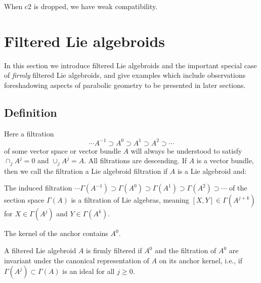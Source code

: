 \documentclass[leqno,12pt]{amsart} %
\newcommand\refreshpage{\newpage}
\newcommand\refreshpage{}
\begin{document}
When c2 is dropped, we have {\df weak compatibility}.

\refreshpage
\section{Filtered Lie algebroids}\label{introduction}
In this section we introduce filtered Lie algebroids and the important special case of
{\em firmly} filtered Lie algebroids, and give examples which include observations
foreshadowing aspects of parabolic geometry to be presented in later sections.

\subsection{Definition}\label{filtered}
Here a filtration $$\cdots A^{-1}\supset A^0 \supset A^1 \supset A^2 \supset\cdots $$ of
some vector space or vector bundle $A$ will always be understood to satisfy
$\cap_j A^j =0$ and $\cup_j A^j = A$. All filtrations are descending.  If $A$ is a vector
bundle, then we call the filtration a {\df Lie algebroid filtration} if $A$ is a Lie
algebroid and:

\begin{conditions}
\item[\bf F1.] The induced filtration
  $\cdots \Gamma(A^{-1})\supset \Gamma(A^0) \supset \Gamma(A^1) \supset \Gamma(A^2)
  \supset\cdots $ of the section space $\Gamma(A)$ is a filtration of Lie algebras,
  meaning $[X, Y] \in \Gamma(A^{j+k})$ for $X \in \Gamma(A^j)$ and $Y \in \Gamma(A^k)$.
\item[\bf F2.] The kernel of the anchor contains $A^0$.\label{fa2}
\end{conditions}

A filtered Lie algebroid $A$ is {\df firmly filtered} if $A^0$ and the filtration of $A^0$
are invariant under the canonical representation of $A$ on its anchor kernel, i.e., if
$\Gamma(A^j) \subset \Gamma(A)$ is an ideal for all $j \ge 0$.
\end{document}
